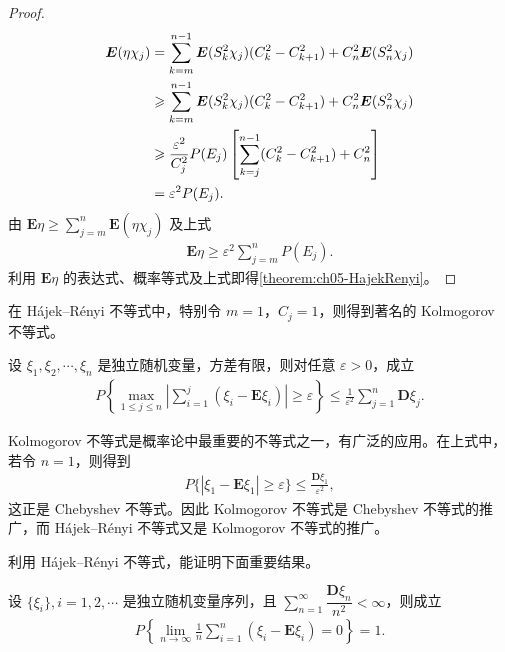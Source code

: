 \documentclass[../../main.tex]{subfiles}
\begin{document}
\begin{proof}
\begin{align}
\boldsymbol{E}(\eta\chi_j)&=\sum_{k=m}^{n-1}\boldsymbol{E}(S_k^{2}\chi_j)(C_k^{2}-C_{k+1}^{2})+C_n^{2}\boldsymbol{E}(S_n^{2}\chi_j)\notag\\
&\geqslant\sum_{k=m}^{n-1}\boldsymbol{E}(S_k^{2}\chi_j)(C_k^{2}-C_{k+1}^{2})+C_n^{2}\boldsymbol{E}(S_n^{2}\chi_j)\notag\\
&\geqslant\frac{\varepsilon^{2}}{C_j^{2}}P(E_j)\left[\sum_{k=j}^{n-1}(C_k^{2}-C_{k+1}^{2})+C_n^{2}\right]\notag\\
&=\varepsilon^{2}P(E_j).
\end{align}
由 $\boldsymbol{E}\eta\geqslant\sum_{j=m}^{n}\boldsymbol{E}(\eta\chi_j)$ 及上式
\begin{align}
\boldsymbol{E}\eta\geqslant\varepsilon^{2}\sum_{j=m}^{n}P(E_j).
\end{align}
利用 $\boldsymbol{E}\eta$ 的表达式、概率等式及上式即得\cref{theorem:ch05-HajekRenyi}。
\end{proof}

在 Hájek--Rényi 不等式中，特别令 $m=1$，$C_j=1$，则得到著名的 Kolmogorov 不等式。

\begin{theorem}\label{theorem:ch05-Kolmogorov不等式}
设 $\xi_1,\xi_2,\cdots,\xi_n$ 是独立随机变量，方差有限，则对任意 $\varepsilon>0$，成立
\begin{align}
P\!\left\{\max_{1\leqslant j\leqslant n}\left|\sum_{i=1}^{j}(\xi_i-\boldsymbol{E}\xi_i)\right|\geqslant\varepsilon\right\}
\leqslant\frac{1}{\varepsilon^{2}}\sum_{j=1}^{n}\boldsymbol{D}\xi_j.
\end{align}
\end{theorem}

Kolmogorov 不等式是概率论中最重要的不等式之一，有广泛的应用。在上式中，若令 $n=1$，则得到
\begin{align*}
P\{|\xi_1-\boldsymbol{E}\xi_1|\geqslant\varepsilon\}\leqslant\frac{\boldsymbol{D}\xi_1}{\varepsilon^{2}},
\end{align*}
这正是 Chebyshev 不等式。因此 Kolmogorov 不等式是 Chebyshev 不等式的推广，而 Hájek--Rényi 不等式又是 Kolmogorov 不等式的推广。

利用 Hájek--Rényi 不等式，能证明下面重要结果。

\begin{theorem}\label{theorem:ch05-Kolmogorov强大数定律}
设 $\{\xi_i\},i=1,2,\cdots$ 是独立随机变量序列，且 $\sum_{n=1}^{\infty}\dfrac{\boldsymbol{D}\xi_n}{n^{2}}<\infty$，则成立
\begin{align}
P\!\left\{\lim_{n\to\infty}\frac1n\sum_{i=1}^{n}(\xi_i-\boldsymbol{E}\xi_i)=0\right\}=1.
\end{align}
\end{theorem}
\end{document}
